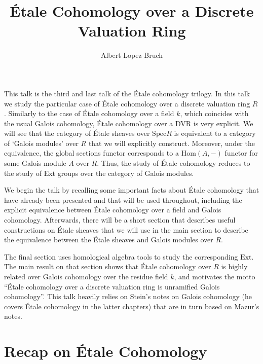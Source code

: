 \documentclass{article}
\title{\'{E}tale Cohomology over a Discrete Valuation Ring}
\author{Albert Lopez Bruch}
\newcommand{\Hom}{\mathrm{Hom}}
\newcommand{\Spec}{\mathrm{Spec}}
\theoremstyle{plain}
\theoremstyle{definition}
\begin{document}
	\maketitle
	This talk is the third and last talk of the \'{E}tale cohomology trilogy. In this talk we study the particular case of \'{E}tale cohomology over a discrete valuation ring $R$. Similarly to the case of \'{E}tale cohomology over a field $k$, which coincides with the usual Galois cohomology, \'{E}tale cohomology over a DVR is very explicit. We will see that the category of \'{E}tale sheaves over $\Spec R$ is equivalent to a category of `Galois modules' over $R$ that we will explicitly construct. Moreover, under the equivalence, the global sections functor corresponds to a $\mathrm{\Hom}(A,-)$ functor for some Galois module $A$ over $R$. Thus, the study of \'{E}tale cohomology reduces to the study of $\mathrm{Ext}$ groups over the category of Galois modules.

    We begin the talk by recalling some important facts about \'{E}tale cohomology that have already been presented and that will be used throughout, including the explicit equivalence between \'{E}tale cohomology over a field and Galois cohomology. Afterwards, there will be a short section that describes useful constructions on \'{E}tale sheaves that we will use in the main section to describe the equivalence between the \'{E}tale sheaves and Galois modules over $R$.
    
    The final section uses homological algebra tools to study the corresponding $\mathrm{Ext}$. The main result on that section shows that \'{E}tale cohomology over $R$ is highly related over Galois cohomology over the residue field $k$, and motivates the motto ``\'{E}tale cohomology over a discrete valuation ring is unramified Galois cohomology''. This talk heavily relies on Stein's notes on Galois cohomology (he covers \'{E}tale cohomology in the latter chapters) that are in turn based on Mazur's notes.

    \section{Recap on \'{E}tale Cohomology}
\end{document}
